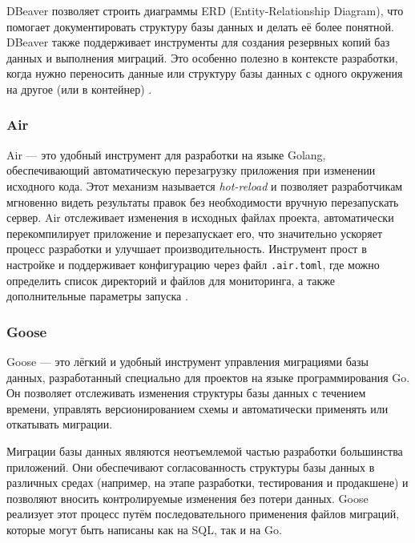 \documentclass[diploma]{SCWorks}
\begin{document}
DBeaver позволяет строить диаграммы ERD (Entity-Relationship Diagram), что 
помогает документировать структуру базы данных и делать её более понятной. 
DBeaver также поддерживает инструменты для создания резервных копий баз данных 
и выполнения миграций. Это особенно полезно в контексте разработки, когда 
нужно переносить данные или структуру базы данных с одного окружения на 
другое (или в контейнер) \cite{dbeaver}.

\subsubsection{Air}

Air — это удобный инструмент для разработки на языке Golang, обеспечивающий 
автоматическую перезагрузку приложения при изменении исходного кода. Этот 
механизм называется \textit{hot-reload} и позволяет разработчикам мгновенно 
видеть результаты правок без необходимости вручную перезапускать сервер. 
Air отслеживает изменения в исходных файлах проекта, автоматически 
перекомпилирует приложение и перезапускает его, что значительно ускоряет 
процесс разработки и улучшает производительность. Инструмент прост в 
настройке и поддерживает конфигурацию через файл \texttt{.air.toml}, 
где можно определить список директорий и файлов для мониторинга, а 
также дополнительные параметры запуска \cite{air}.

\subsubsection{Goose}

Goose — это лёгкий и удобный инструмент управления миграциями базы данных, 
разработанный специально для проектов на языке программирования Go. Он 
позволяет отслеживать изменения структуры базы данных с течением времени, 
управлять версионированием схемы и автоматически применять или откатывать 
миграции.

Миграции базы данных являются неотъемлемой частью разработки большинства 
приложений. Они обеспечивают согласованность структуры базы данных в различных 
средах (например, на этапе разработки, тестирования и продакшене) и позволяют 
вносить контролируемые изменения без потери данных. Goose реализует этот 
процесс путём последовательного применения файлов миграций, которые могут быть 
написаны как на SQL, так и на Go.
\end{document}
